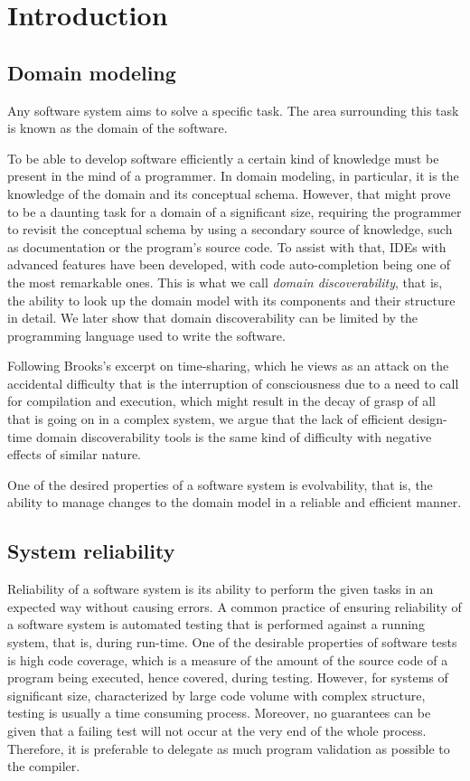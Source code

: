 \chapter{Introduction}

\section{Domain modeling}
Any software system aims to solve a specific task. The area surrounding this task is known as the domain of the software.

\n

To be able to develop software efficiently a certain kind of knowledge must be present in the mind of a programmer. In domain modeling, in particular, it is the knowledge of the domain and its conceptual schema. However, that might prove to be a daunting task for a domain of a significant size, requiring the programmer to revisit the conceptual schema by using a secondary source of knowledge, such as documentation or the program’s source code. To assist with that, IDEs with advanced features have been developed, with code auto-completion being one of the most remarkable ones. This is what we call \textit{domain discoverability}, that is, the ability to look up the domain model with its components and their structure in detail. We later show that domain discoverability can be limited by the programming language used to write the software.

\n

Following Brooks’s excerpt on time-sharing, which he views as an attack on the accidental difficulty that is the interruption of consciousness due to a need to call for compilation and execution, which might result in the decay of grasp of all that is going on in a complex system, we argue that the lack of efficient design-time domain discoverability tools is the same kind of difficulty with negative effects of similar nature.

\n

One of the desired properties of a software system is evolvability, that is, the ability to manage changes to the domain model in a reliable and efficient manner.

\section{System reliability}

Reliability of a software system is its ability to perform the given tasks in an expected way without causing errors. A common practice of ensuring reliability of a software system is automated testing that is performed against a running system, that is, during run-time. One of the desirable properties of software tests is high code coverage, which is a measure of the amount of the source code of a program being executed, hence covered, during testing. However, for systems of significant size, characterized by large code volume with complex structure, testing is usually a time consuming process. Moreover, no guarantees can be given that a failing test will not occur at the very end of the whole process. Therefore, it is preferable to delegate as much program validation as possible to the compiler.

